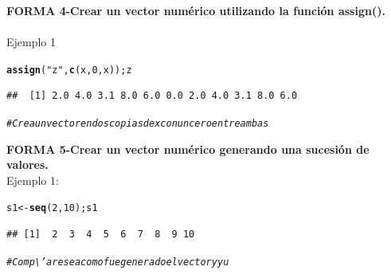\documentclass[12pt,letterpaper]{article}\usepackage[]{graphicx}\usepackage[]{color}
\makeatletter
\newcommand{\hlnum}[1]{\textcolor[rgb]{0.686,0.059,0.569}{#1}}%
\newcommand{\hlstr}[1]{\textcolor[rgb]{0.192,0.494,0.8}{#1}}%
\newcommand{\hlcom}[1]{\textcolor[rgb]{0.678,0.584,0.686}{\textit{#1}}}%
\newcommand{\hlstd}[1]{\textcolor[rgb]{0.345,0.345,0.345}{#1}}%
\newcommand{\hlkwb}[1]{\textcolor[rgb]{0.69,0.353,0.396}{#1}}%
\newcommand{\hlkwd}[1]{\textcolor[rgb]{0.737,0.353,0.396}{\textbf{#1}}}%
\newenvironment{kframe}{%
 \def\at@end@of@kframe{}%
 \ifinner\ifhmode%
  \def\at@end@of@kframe{\end{minipage}}%
  \begin{minipage}{\columnwidth}%
 \fi\fi%
 \def\FrameCommand##1{\hskip\@totalleftmargin \hskip-\fboxsep
 \colorbox{shadecolor}{##1}\hskip-\fboxsep
     \hskip-\linewidth \hskip-\@totalleftmargin \hskip\columnwidth}%
 \MakeFramed {\advance\hsize-\width
   \@totalleftmargin\z@ \linewidth\hsize
   \@setminipage}}%
 {\par\unskip\endMakeFramed%
 \at@end@of@kframe}
\newenvironment{knitrout}{}{} %
\makeatother
\begin{document}
\textbf{FORMA 4-Crear un vector numérico utilizando la funci\'on assign().}\\

\\ Ejemplo 1
\begin{knitrout}
\color{fgcolor}\begin{kframe}
\begin{alltt}
\hlkwd{assign}\hlstd{(}\hlstr{"z"}\hlstd{,} \hlkwd{c}\hlstd{(x,} \hlnum{0}\hlstd{, x)); z}
\end{alltt}
\begin{verbatim}
##  [1] 2.0 4.0 3.1 8.0 6.0 0.0 2.0 4.0 3.1 8.0 6.0
\end{verbatim}
\begin{alltt}
\hlcom{# Crea un vector en dos copias de x con un cero entre ambas}
\end{alltt}
\end{kframe}
\end{knitrout}

\textbf{FORMA 5-Crear un vector num\'erico generando una sucesi\'on de valores.}\\

Ejemplo 1: 
\begin{knitrout}
\color{fgcolor}\begin{kframe}
\begin{alltt}
\hlstd{s1} \hlkwb{<-} \hlkwd{seq}\hlstd{(}\hlnum{2}\hlstd{,} \hlnum{10}\hlstd{); s1}
\end{alltt}
\begin{verbatim}
## [1]  2  3  4  5  6  7  8  9 10
\end{verbatim}
\begin{alltt}
\hlcom{# Comp\textbackslash{}'arese a como fue generado el vector y y u}
\end{alltt}
\end{kframe}
\end{knitrout}
\end{document}
